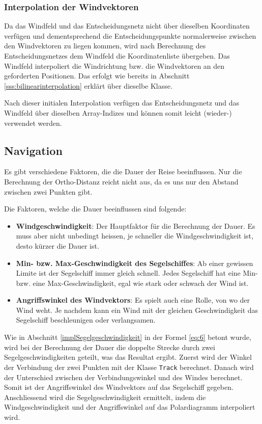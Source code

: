 \subsubsection{Interpolation der Windvektoren}
Da das Windfeld und das Entscheidungsnetz nicht über dieselben Koordinaten
verfügen und dementsprechend die Entscheidungspunkte normalerweise zwischen den
Windvektoren zu liegen kommen, wird nach Berechnung des Entscheidungsnetzes dem
Windfeld die Koordinatenliste übergeben. Das Windfeld interpoliert die
Windrichtung bzw. die Windvektoren an den geforderten Positionen. Das erfolgt
wie bereits in Abschnitt \ref{sss:bilinearinterpolation} erklärt über dieselbe
Klasse.

Nach dieser initialen Interpolation verfügen das Entscheidungsnetz und das
Windfeld über dieselben Array-Indizes und können somit leicht (wieder-)
verwendet werden.

\subsection{Navigation}
Es gibt verschiedene Faktoren, die die Dauer der Reise beeinflussen. Nur die
Berechnung der Ortho-Distanz reicht nicht aus, da es uns nur den Abstand
zwischen zwei Punkten gibt.

Die Faktoren, welche die Dauer beeinflussen sind folgende:

\begin{itemize}
\item \textbf{Windgeschwindigkeit}: Der Hauptfaktor für die Berechnung der
Dauer. Es muss aber nicht unbedingt heissen, je schneller die
Windgeschwindigkeit ist, desto kürzer die Dauer ist.

\item \textbf{Min- bzw. Max-Geschwindigkeit des Segelschiffes}: Ab einer
gewissen Limite ist der Segelschiff immer gleich schnell. Jedes Segelschiff
hat eine Min- bzw. eine Max-Geschwindigkeit, egal wie stark oder schwach der
Wind ist.

\item \textbf{Angriffswinkel des Windvektors}: Es spielt auch eine Rolle, von
wo der Wind weht. Je nachdem kann ein Wind mit der gleichen Geschwindigkeit
das Segelschiff beschleunigen oder verlangsamen.
\end{itemize}

Wie in Abschnitt \ref{implSegelgeschwindigkeit} in der Formel \eqref{eq:6}
betont wurde, wird bei der Berechnung der Dauer die doppelte Strecke durch
zwei Segelgeschwindigkeiten geteilt, was das Resultat ergibt. Zuerst wird der
Winkel der Verbindung der zwei Punkten mit der Klasse \texttt{Track} berechnet.
Danach wird der Unterschied zwischen der Verbindungswinkel und des Windes
berechnet. Somit ist der Angriffswinkel des Windvektors auf das Segelschiff
gegeben. Anschliessend wird die Segelgeschwindigkeit ermittelt, indem die
Windgeschwindigkeit und der Angriffswinkel auf das Polardiagramm interpoliert
wird.

